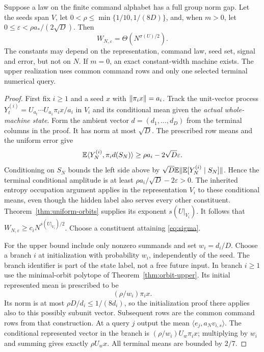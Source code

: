\begin{theorem}\label{thm:sum-width}
Suppose a law on the finite command alphabet has a full group norm
gap. Let the seeds span $V$, let
$0<\rho\le\min\{1/10,1/(8D)\}$, and, when $m>0$, let
$0\le\varepsilon<\rho a_*/(2\sqrt D)$. Then
\begin{equation}\label{eq:sum-width}
                   W_{N,\varepsilon}=\Theta(N^{\sigma(U)/2}).
\end{equation}
The constants may depend on the representation, command law, seed
set, signal and error, but not on $N$. If $m=0$, an exact constant-width
machine exists. The upper realization uses common command rows and
only one selected terminal numerical query.
\end{theorem}
\begin{proof}
First fix $i\ge1$ and a seed $x$ with
$\lVert\pi_ix\rVert=a_i$. Track the unit-vector process
$Y_t^{(i)}=U_{a_t}\cdots U_{a_1}\pi_i x/a_i$ in $V_i$ and its
conditional mean given the \emph{actual whole-machine state}. Form
the ambient vector $d=(d_1,\ldots,d_D)$ from the terminal columns in
the proof. It has norm at most $\sqrt D$. The prescribed row means
and the uniform error give
\[
 \mathbb E\langle Y_N^{(i)},\pi_i d(S_N)\rangle
                \ge\rho a_i-2\sqrt D\varepsilon.
\]
Conditioning on $S_N$ bounds the left side above by
$\sqrt D\mathbb E\lVert\mathbb E[Y_N^{(i)}\mid S_N]\rVert$.
Hence the terminal conditional amplitude is at least
$\rho a_i/\sqrt D-2\varepsilon>0$. The inherited entropy occupation
argument applies in the representation $V_i$ to these conditional
means, even though the hidden label also serves every other
constituent. Theorem~\ref{thm:uniform-orbits} supplies its exponent
$s(U|_{V_i})$. It follows that
$W_{N,\varepsilon}\ge c_iN^{s(U|_{V_i})/2}$.
Choose a constituent attaining \eqref{eq:sigma}.

For the upper bound include only nonzero summands and set $w_i=d_i/D$.
Choose a branch $i$ at initialization with probability $w_i$,
independently of the seed. The branch identifier is part of the state
label, not a free future input. In branch $i\ge1$ use the minimal-orbit
polytope of Theorem~\ref{thm:orbit-upper}. Its initial represented mean
is prescribed to be
\[
                       (\rho/w_i)\pi_i x.
\]
Its norm is at most $\rho D/d_i\le1/(8d_i)$, so the initialization
proof there applies also to this possibly subunit vector. Subsequent
rows are the common command rows from that construction. At a query
$j$ output the mean $\langle e_j,a_Nv_{i,s}\rangle$. The conditional
represented vector in the branch is
$(\rho/w_i)U_w\pi_ix$; multiplying by $w_i$ and summing gives exactly
$\rho U_wx$. All terminal means are bounded by $2/7$.


\end{proof}
